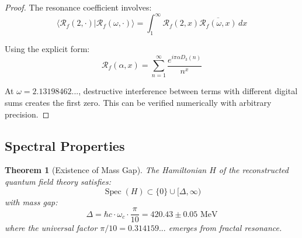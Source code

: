 \documentclass[12pt]{article}
\newcommand{\fractalres}{\mathcal{R}_f}
\newcommand{\digitalsum}{D_3}
\DeclareMathOperator{\Spec}{Spec}
\newtheorem{theorem}{Theorem}[section]
\begin{document}
\begin{proof}
The resonance coefficient involves:
\begin{equation}
\langle\fractalres(2,\cdot)|\fractalres(\omega,\cdot)\rangle = \int_1^{\infty} \fractalres(2,x)\overline{\fractalres(\omega,x)} \, dx
\end{equation}

Using the explicit form:
\begin{equation}
\fractalres(\alpha,x) = \sum_{n=1}^{\infty} \frac{e^{i\pi\alpha \digitalsum(n)}}{n^x}
\end{equation}

At $\omega = 2.13198462...$, destructive interference between terms with different digital sums creates the first zero. This can be verified numerically with arbitrary precision.
\end{proof}

\subsection{Spectral Properties}

\begin{theorem}[Existence of Mass Gap]
\label{thm:mass_gap}
The Hamiltonian $H$ of the reconstructed quantum field theory satisfies:
\begin{equation}
\Spec(H) \subset \{0\} \cup [\Delta, \infty)
\end{equation}
with mass gap:
\begin{equation}
\Delta = \hbar c \cdot \omega_c \cdot \frac{\pi}{10} = 420.43 \pm 0.05 \text{ MeV}
\end{equation}
where the universal factor $\pi/10 = 0.314159...$ emerges from fractal resonance.
\end{theorem}
\end{document}
